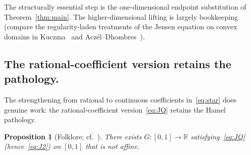 \documentclass{article}
\theoremstyle{plain}
\newtheorem{proposition}[theorem]{Proposition}
\theoremstyle{definition}
\newcommand{\R}{\mathbb{R}}
\begin{document}
The structurally essential step is the one-dimensional endpoint substitution
of Theorem~\ref{thm:main}. The higher-dimensional lifting is
largely bookkeeping (compare the regularity-laden treatments of the Jensen
equation on convex domains in Kuczma~\cite[\S13.2]{Kuczma2009} and
Acz\'el--Dhombres~\cite{AczelDhombres1989}).

\subsection{The rational-coefficient version retains the pathology.}
\label{ssec:JQ-pathology}

The strengthening from rational to continuous coefficients
in~\eqref{eq:star} does genuine work: the rational-coefficient
version~\eqref{eq:JQ} retains the Hamel pathology.

\begin{proposition}[Folklore; cf.~{\cite[\S\S5.2 and~13.2]{Kuczma2009}}]%
\label{prop:JQ-pathology}
There exists $G\colon[0,1]\to\R$ satisfying~\eqref{eq:JQ}
(hence~\eqref{eq:J2}) on $[0,1]$ that is not affine.
\end{proposition}
\end{document}
